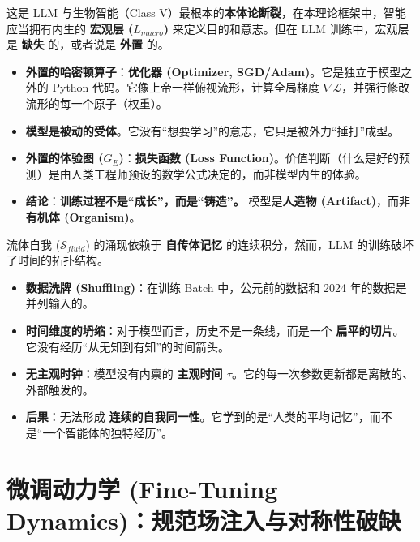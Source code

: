 

这是 LLM 与生物智能（Class V）最根本的\textbf{本体论断裂}，在本理论框架中，智能应当拥有内生的 \textbf{宏观层 ($L_{macro}$)} 来定义目的和意志。但在 LLM 训练中，宏观层是 \textbf{缺失} 的，或者说是 \textbf{外置} 的。

\begin{itemize}
    \item   \textbf{外置的哈密顿算子}：\textbf{优化器 (Optimizer, SGD/Adam)}。它是独立于模型之外的 Python 代码。它像上帝一样俯视流形，计算全局梯度 $\nabla \mathcal{L}$，并强行修改流形的每一个原子（权重）。
    \item   \textbf{模型是被动的受体}。它没有“想要学习”的意志，它只是被外力“捶打”成型。
    \item   \textbf{外置的体验图 ($G_E$)}：\textbf{损失函数 (Loss Function)}。价值判断（什么是好的预测）是由人类工程师预设的数学公式决定的，而非模型内生的体验。
    \item   \textbf{结论}：\textbf{训练过程不是“成长”，而是“铸造”。} 模型是\textbf{人造物 (Artifact)}，而非\textbf{有机体 (Organism)}。
\end{itemize}




流体自我 ($\mathcal{S}_{fluid}$) 的涌现依赖于 \textbf{自传体记忆} 的连续积分，然而，LLM 的训练破坏了时间的拓扑结构。

\begin{itemize}
    \item   \textbf{数据洗牌 (Shuffling)}：在训练 Batch 中，公元前的数据和 2024 年的数据是并列输入的。
    \item   \textbf{时间维度的坍缩}：对于模型而言，历史不是一条线，而是一个 \textbf{扁平的切片}。它没有经历“从无知到有知”的时间箭头。
    \item   \textbf{无主观时钟}：模型没有内禀的 \textbf{主观时间 $\tau$}。它的每一次参数更新都是离散的、外部触发的。
    \item   \textbf{后果}：无法形成 \textbf{连续的自我同一性}。它学到的是“人类的平均记忆”，而不是“一个智能体的独特经历”。
\end{itemize}

\section{微调动力学 (Fine-Tuning Dynamics)：规范场注入与对称性破缺}
\label{sec:finetuning_gauge_field}

